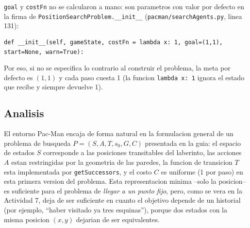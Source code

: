\texttt{goal} y \texttt{costFn} no se calcularon a mano: son parametros con valor por defecto en la
firma de \texttt{PositionSearchProblem.\_\_init\_\_} (\texttt{pacman/searchAgents.py}, linea 131):

\begin{verbatim}
def __init__(self, gameState, costFn = lambda x: 1, goal=(1,1), start=None, warn=True):
\end{verbatim}

Por eso, si no se especifica lo contrario al construir el problema, la meta por defecto es $(1,1)$
y cada paso cuesta 1 (la funcion \texttt{lambda x: 1} ignora el estado que recibe y siempre
devuelve 1).

\subsection{Analisis}

El entorno Pac-Man encaja de forma natural en la formulacion general de un problema de busqueda
$P = (S, A, T, s_0, G, C)$ presentada en la guia: el espacio de estados $S$ corresponde a las
posiciones transitables del laberinto, las acciones $A$ estan restringidas por la geometria de
las paredes, la funcion de transicion $T$ esta implementada por \texttt{getSuccessors}, y el
costo $C$ es uniforme (1 por paso) en esta primera version del problema. Esta representacion
minima --solo la posicion-- es suficiente para el problema de \emph{llegar a un punto fijo}, pero,
como se vera en la Actividad 7, deja de ser suficiente en cuanto el objetivo depende de un
historial (por ejemplo, ``haber visitado ya tres esquinas''), porque dos estados con la misma
posicion $(x,y)$ dejarian de ser equivalentes.
